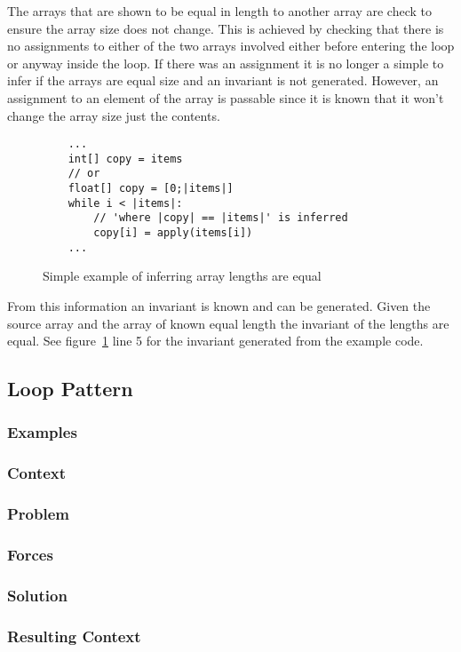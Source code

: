 The arrays that are shown to be equal in length to another array are
check to ensure the array size does not change.
This is achieved by checking that there is no assignments to either
of the two arrays involved either before entering the loop or
anyway inside the loop.
If there was an assignment it is no longer a simple to infer if
the arrays are equal size and an invariant is not generated.
However, an assignment to an element of the array is passable since it
is known that it won't change the array size just the contents.

\begin{figure}[ht]
\begin{lstlisting}
    ...
    int[] copy = items
    // or
    float[] copy = [0;|items|]
    while i < |items|:
        // 'where |copy| == |items|' is inferred
        copy[i] = apply(items[i])
    ...
\end{lstlisting}
\caption{Simple example of inferring array lengths are equal}
\label{lst:whiley-length}
\end{figure}

From this information an invariant is known and can be generated.
Given the source array and the array of known equal length the
invariant of the lengths are equal.
See figure~\ref{lst:whiley-length} line 5 for the invariant generated
from the example code.

\subsection{Loop Pattern}

\subsubsection{Examples}
\subsubsection{Context}
\subsubsection{Problem}
\subsubsection{Forces}
\subsubsection{Solution}
\subsubsection{Resulting Context}

